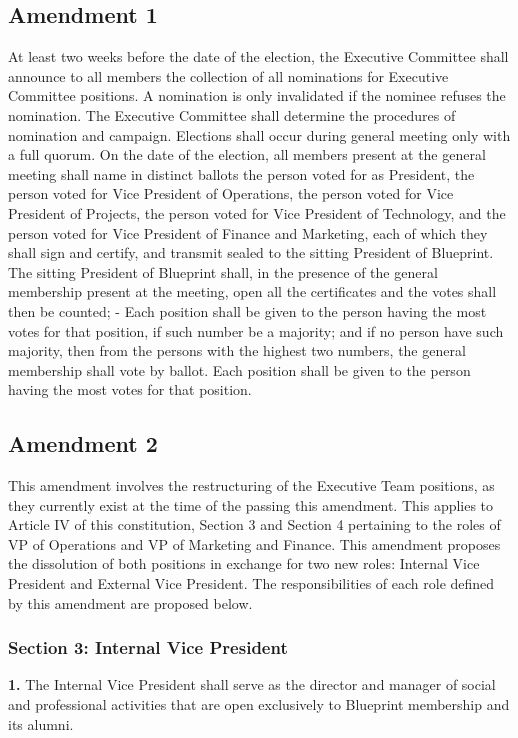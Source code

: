 \documentclass{article}
\begin{document}
\subsection{Amendment 1}
At least two weeks before the date of the election, the Executive Committee shall announce to all members the collection of all nominations for Executive Committee positions. A nomination is only invalidated if the nominee refuses the nomination. The Executive Committee shall determine the procedures of nomination and campaign. Elections shall occur during general meeting only with a full quorum. On the date of the election, all members present at the general meeting shall name in distinct ballots the person voted for as President, the person voted for Vice President of Operations, the person voted for Vice President of Projects, the person voted for Vice President of Technology, and the person voted for Vice President of Finance and Marketing, each of which they shall sign and certify, and transmit sealed to the sitting President of Blueprint. The sitting President of Blueprint shall, in the presence of the general membership present at the meeting, open all the certificates and the votes shall then be counted; - Each position shall be given to the person having the most votes for that position, if such number be a majority; and if no person have such majority, then from the persons with the highest two numbers, the general membership shall vote by ballot. Each position shall be given to the person having the most votes for that position.

\subsection{Amendment 2}
This amendment involves the restructuring of the Executive Team positions, as they currently exist at the time of the passing this amendment. This applies to Article IV of this constitution, Section 3 and Section 4 pertaining to the roles of VP of Operations and VP of Marketing and Finance. This amendment proposes the dissolution of both positions in exchange for two new roles: Internal Vice President and External Vice President. The responsibilities of each role defined by this amendment are proposed below.

\subsubsection{Section 3: Internal Vice President}

\textbf{1.} The Internal Vice President shall serve as the director and manager of social and professional activities that are open exclusively to Blueprint membership and its alumni.
\end{document}
